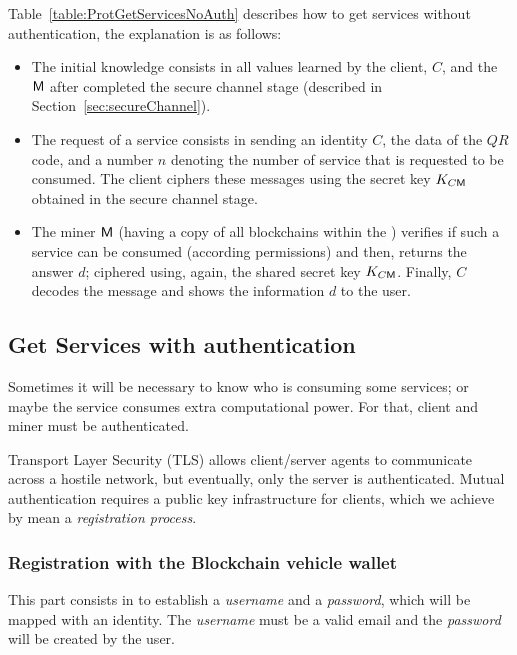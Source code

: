 Table~\ref{table:ProtGetServicesNoAuth} describes how to get services without authentication,
the explanation is as follows:
\begin{itemize}
  \item  The initial knowledge consists in all values learned by the client, $C$, and the 
    \blockchaincarnetwork~ $\textsf{M}$ after completed the secure channel stage 
    (described in Section~\ref{sec:secureChannel}).
   \item The request of a service consists in sending an identity $C$, the data of the $QR$ code, and a 
        number $n$ denoting the number of service that is requested to be consumed. 
        The client ciphers  these messages using the secret key $K_{C\textsf{M}}$ obtained in
        the secure channel stage. 
   \item The miner $\textsf{M}$ (having a copy of all blockchains within the \blockchaincarnetwork) verifies 
        if such a service can be consumed (according permissions) and then, 
        returns the answer $d$; ciphered using, again, the shared secret key $K_{C\textsf{M}}$. Finally,
        $C$ decodes the message and shows the information $d$ to the user.
\end{itemize}




\subsection{Get Services with authentication}
\label{ssec:ServAuth}
Sometimes it will be necessary to know who is consuming some services; or maybe the service consumes extra 
computational power. For that, client and miner must be authenticated. 

Transport Layer Security (TLS) allows client/server agents to communicate 
across a hostile network, but eventually, only the server is authenticated. 
Mutual authentication requires a public key infrastructure for clients, which
we achieve by mean a \textit{registration process}. 

\subsubsection{Registration with the Blockchain vehicle wallet}
\label{sec:Registration}

This part consists in to establish a \textit{username} and a \textit{password}, which
will be mapped with an identity. The \textit{username} must be a valid email and the 
\textit{password} will be created by the user.

